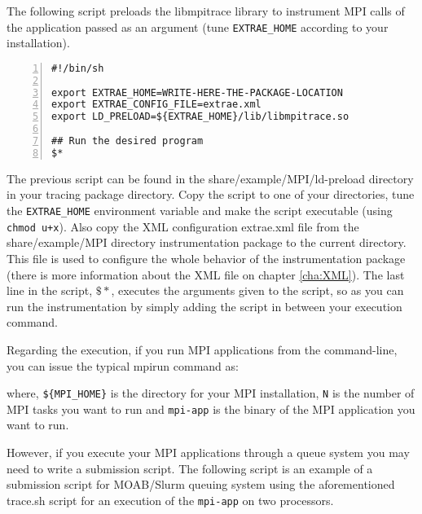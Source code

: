 
The following script preloads the libmpitrace library to instrument MPI calls of the application passed as an argument (tune {\tt EXTRAE\_HOME} according to your installation).

\begin{Verbatim}[frame=single,numbers=left,labelposition=topline,label=trace.sh]
#!/bin/sh

export EXTRAE_HOME=WRITE-HERE-THE-PACKAGE-LOCATION
export EXTRAE_CONFIG_FILE=extrae.xml
export LD_PRELOAD=${EXTRAE_HOME}/lib/libmpitrace.so

## Run the desired program
$*
\end{Verbatim}

The previous script can be found in the share/example/MPI/ld-preload directory in your tracing package directory. Copy the script to one of your directories, tune the {\tt EXTRAE\_HOME} environment variable and make the script executable (using {\tt chmod u+x}). Also copy the XML configuration extrae.xml file from the share/example/MPI directory instrumentation package to the current directory. This file is used to configure the whole behavior of the instrumentation package (there is more information about the XML file on chapter \ref{cha:XML}). The last line in the script, $\$\ast$, executes the arguments given to the script, so as you can run the instrumentation by simply adding the script in between your execution command.

Regarding the execution, if you run MPI applications from the command-line, you can issue the typical mpirun command as:


where, {\tt \$\{MPI\_HOME\}} is the directory for your MPI installation, {\tt N} is the number of MPI tasks you want to run and {\tt mpi-app} is the binary of the MPI application you want to run.

However, if you execute your MPI applications through a queue system you may need to write a submission script. The following script is an example of a submission script for MOAB/Slurm queuing system using the aforementioned trace.sh script for an execution of the {\tt mpi-app} on two processors.

